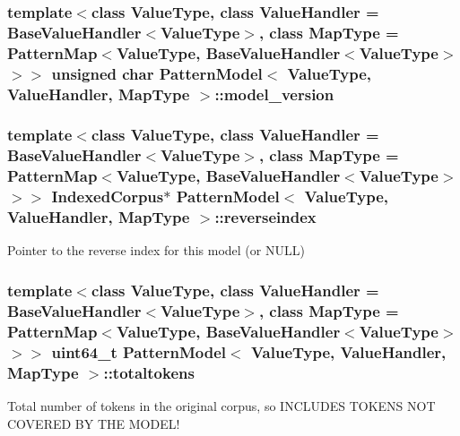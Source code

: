 \subsubsection[{model\+\_\+version}]{\setlength{\rightskip}{0pt plus 5cm}template$<$class Value\+Type, class Value\+Handler = Base\+Value\+Handler$<$\+Value\+Type$>$, class Map\+Type = Pattern\+Map$<$\+Value\+Type, Base\+Value\+Handler$<$\+Value\+Type$>$$>$$>$ unsigned char {\bf Pattern\+Model}$<$ Value\+Type, Value\+Handler, Map\+Type $>$\+::model\+\_\+version\hspace{0.3cm}{\ttfamily [protected]}}\label{classPatternModel_a032f1517ae658e81fa2ca3360aba62a2}
\hypertarget{classPatternModel_a17ad27133991f964ccd23bb09bf64e5a}{}
\subsubsection[{reverseindex}]{\setlength{\rightskip}{0pt plus 5cm}template$<$class Value\+Type, class Value\+Handler = Base\+Value\+Handler$<$\+Value\+Type$>$, class Map\+Type = Pattern\+Map$<$\+Value\+Type, Base\+Value\+Handler$<$\+Value\+Type$>$$>$$>$ {\bf Indexed\+Corpus}$\ast$ {\bf Pattern\+Model}$<$ Value\+Type, Value\+Handler, Map\+Type $>$\+::reverseindex}\label{classPatternModel_a17ad27133991f964ccd23bb09bf64e5a}


Pointer to the reverse index for this model (or N\+U\+L\+L) 

\hypertarget{classPatternModel_a4667c917fab96ae756ee61693220f44e}{}
\subsubsection[{totaltokens}]{\setlength{\rightskip}{0pt plus 5cm}template$<$class Value\+Type, class Value\+Handler = Base\+Value\+Handler$<$\+Value\+Type$>$, class Map\+Type = Pattern\+Map$<$\+Value\+Type, Base\+Value\+Handler$<$\+Value\+Type$>$$>$$>$ uint64\+\_\+t {\bf Pattern\+Model}$<$ Value\+Type, Value\+Handler, Map\+Type $>$\+::totaltokens\hspace{0.3cm}{\ttfamily [protected]}}\label{classPatternModel_a4667c917fab96ae756ee61693220f44e}


Total number of tokens in the original corpus, so I\+N\+C\+L\+U\+D\+E\+S T\+O\+K\+E\+N\+S N\+O\+T C\+O\+V\+E\+R\+E\+D B\+Y T\+H\+E M\+O\+D\+E\+L! 

